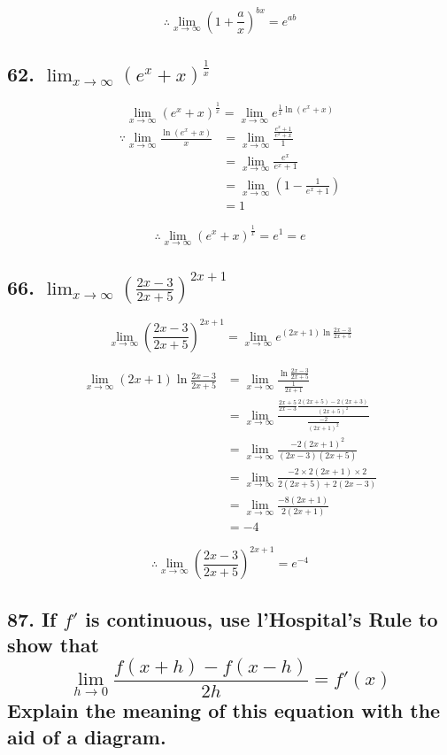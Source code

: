 \documentclass{article}
\begin{document}
    $$\therefore \lim_{x \to \infty}(1 + \frac a x)^{bx} = e^{ab}$$

    \subsection*{62. $\lim_{x\to \infty}(e^x + x)^{\frac 1 x}$}

    $$\lim_{x \to \infty}(e^x + x)^{\frac 1 x} = \lim_{x \to \infty}e^{\frac 1 x \ln(e^x + x)}$$
    $$\begin{aligned}
        \because \lim_{x \to \infty}\frac{\ln(e^x + x)}{x} &= \lim_{x \to \infty}\frac{\frac{e^x + 1}{e^x + x}}{1} \\
        &= \lim_{x \to \infty}\frac{e^x}{e^x + 1} \\
        &= \lim_{x \to \infty}(1 - \frac{1}{e^x  + 1}) \\
        &= 1
    \end{aligned}$$

    $$\therefore \lim_{x \to \infty}(e^x + x) ^{\frac 1 x} = e^1 = e$$

    \subsection*{66. $\lim_{x \to \infty}(\frac{2x - 3}{2x + 5})^{2x + 1}$}

    $$\lim_{x \to \infty}(\frac{2x - 3}{2x + 5})^{2x + 1} = \lim_{x \to \infty}e^{(2x + 1) \ln \frac{2x - 3}{2x + 5}}$$

    $$\begin{aligned}
        \lim_{x \to \infty}(2x + 1)\ln \frac{2x - 3}{2x + 5} &= \lim_{x \to \infty}\frac{\ln \frac{2x - 3}{2x + 5}}{\frac{1}{2x + 1}} \\
        &= \lim_{x \to \infty}\frac{\frac{2x + 5}{2x - 3} \frac{2(2x + 5) - 2(2x + 3)}{(2x + 5)^2}}{\frac{-2}{(2x + 1)^2}} \\
        &= \lim_{x \to \infty}\frac{-2(2x + 1)^2}{(2x - 3)(2x + 5)} \\
        &= \lim_{x \to \infty}\frac{-2 \times 2(2x + 1) \times 2}{2(2x + 5) + 2(2x - 3)} \\
        &= \lim_{x \to \infty}\frac{-8(2x + 1)}{2(2x + 1)} \\
        &= -4
    \end{aligned}$$

    $$\therefore \lim_{x \to \infty}(\frac{2x - 3}{2x + 5})^{2x + 1} = e^{-4}$$

    \subsection*{87. If $f'$ is continuous, use l'Hospital's Rule to show that $$\lim_{h \to 0}\frac{f(x + h) - f(x - h)}{2h} = f'(x)$$ Explain the meaning of this equation with the aid of a diagram.}
\end{document}
